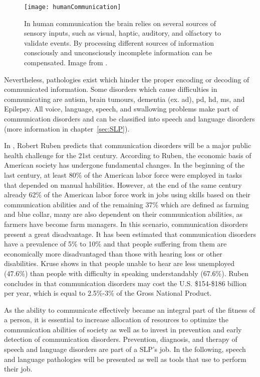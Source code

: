 \begin{figure}
\centering
 \texttt{[image: humanCommunication]}
 \caption{In human communication the brain relies on several sources of sensory inputs,  such as visual, haptic, auditory, and  olfactory to validate events. By processing different sources of information consciously and unconsciously incomplete information can be compensated. Image from \cite{Poria2017}.}
 \label{fig:humanCommunication}
 \end{figure} 

Nevertheless, pathologies exist which hinder the proper encoding or decoding of communicated information. Some disorders which cause difficulties in communicating are autism, brain tumours, dementia (ex. \gls{ad}), \gls{pd}, \gls{hd}, \gls{ms}, and Epilepsy. All voice, language, speech, and swallowing problems make part of communication disorders and can be classified into speech and language disorders (more information in chapter~\ref{sec:SLP}). 

In \cite{Ruben2000}, Robert Ruben predicts that communication disorders will be a major public health challenge for the 21st century. According to Ruben, the economic basis of American society has undergone fundamental changes. In the beginning of the last century, at least 80\% of the American labor force were employed in tasks that depended on manual habilities. However, at the end of the same century already 62\% of the American labor force work in jobs using skills based on their communication abilities and of the remaining 37\% which are defined as farming and blue collar, many are also dependent on their communication abilities, as farmers have become farm managers. In this scenario, communication disorders present a great disadvantage. It has been estimated that communication disorders have a prevalence of 5\% to 10\% and that people suffering from them are economically more disadvantaged than those with hearing loss or other disabilities. Kruse shows in \cite{Kruse1997} that people unable to hear are less unemployed (47.6\%) than people with difficulty in speaking understandably (67.6\%). Ruben concludes in \cite{Ruben2000} that communication disorders may cost the U.S. \$154-\$186 billion per year, which is equal to 2.5\%-3\% of the Gross National Product.

As the ability to communicate effectively became an integral part of the fitness of a person, it is essential to increase allocation of resources to optimize the communication abilities of society as well as to invest in prevention and early detection of communication disorders. Prevention, diagnosis, and therapy of speech and language disorders are part of a SLP's job. In the following, speech and language pathologies will be presented as well as tools that  use to perform their job.

